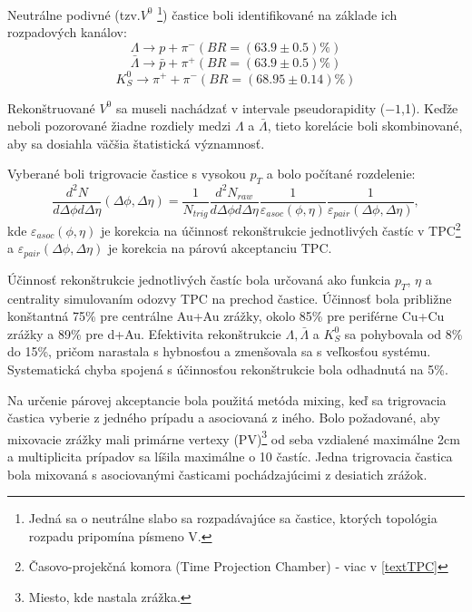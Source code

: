 \documentclass[thesismargins, thesislinespacing]{rnthesis}
\begin{document}
Neutrálne podivné (tzv.$V^0$ \footnote{Jedná sa o neutrálne slabo sa rozpadávajúce sa častice, ktorých topológia rozpadu pripomína písmeno V.}) častice boli identifikované na základe ich rozpadových kanálov:
\begin{equation}
\Lambda \rightarrow p + \pi^{-}  (BR=(63.9 \pm 0.5)\%)
\end{equation}
\begin{equation}
\bar{\Lambda} \rightarrow \bar{p} + \pi^{+}  (BR=(63.9 \pm 0.5)\%)
\end{equation}
\begin{equation}
K^0_S \rightarrow \pi^{+} + \pi^{-}  (BR=(68.95 \pm 0.14)\%)
\end{equation}

Rekonštruované $V^0$ sa museli nachádzať v intervale pseudorapidity ($-1$,1). Keďže neboli pozorované žiadne rozdiely medzi $\Lambda$ a $\bar{\Lambda}$, tieto korelácie boli skombinované, aby sa dosiahla väčšia štatistická významnosť.

Vyberané boli trigrovacie častice s vysokou $p_T$ a bolo počítané rozdelenie:
\begin{equation}
\frac{d^2N}{d\Delta \phi d\Delta \eta}(\Delta\phi,\Delta\eta) = \frac{1}{N_{trig}}\frac{d^2N_{raw}}{d\Delta \phi d\Delta \eta}\frac{1}{\varepsilon_{asoc}(\phi,\eta)}\frac{1}{\varepsilon_{pair}(\Delta\phi,\Delta\eta)},
\end{equation}
kde $\varepsilon_{asoc}(\phi,\eta)$ je korekcia na účinnosť rekonštrukcie jednotlivých častíc v TPC\footnote{Časovo-projekčná komora (Time Projection Chamber) - viac v \ref{textTPC}} a $\varepsilon_{pair}(\Delta\phi,\Delta\eta)$ je korekcia na párovú akceptanciu TPC. 

Účinnosť rekonštrukcie jednotlivých častíc bola určovaná ako funkcia $p_T$, $\eta$ a centrality simulovaním odozvy TPC na prechod častice. Účinnosť bola približne konštantná 75\% pre centrálne Au+Au zrážky, okolo 85\% pre periférne Cu+Cu zrážky a 89\% pre d+Au. Efektivita rekonštrukcie $\Lambda, \bar{\Lambda}$ a $K^0_S$ sa pohybovala od 8\% do 15\%, pričom narastala s hybnosťou a zmenšovala sa s veľkosťou systému. Systematická chyba spojená s účinnosťou rekonštrukcie bola odhadnutá na 5\%.

Na určenie párovej akceptancie bola použitá metóda mixing, keď sa trigrovacia častica vyberie z jedného prípadu a asociovaná z iného. Bolo požadované, aby mixovacie zrážky mali primárne vertexy (PV)\footnote{Miesto, kde nastala zrážka.} od seba vzdialené maximálne 2cm a multiplicita prípadov sa líšila maximálne o 10 častíc. Jedna trigrovacia častica bola mixovaná s asociovanými časticami pochádzajúcimi z desiatich zrážok.
\end{document}
